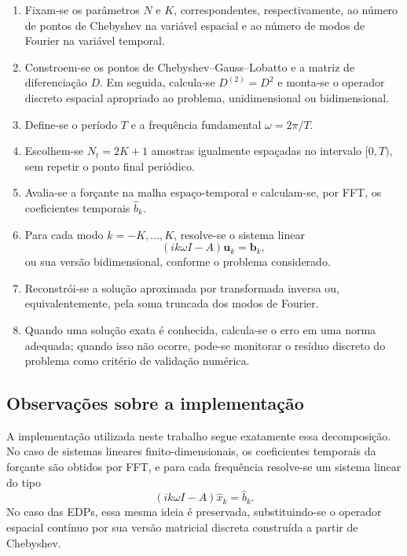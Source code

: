 \begin{enumerate}
    \item Fixam-se os parâmetros \(N\) e \(K\), correspondentes, respectivamente, ao número de pontos de Chebyshev na variável espacial e ao número de modos de Fourier na variável temporal.

    \item Constroem-se os pontos de Chebyshev--Gauss--Lobatto e a matriz de diferenciação \(D\). Em seguida, calcula-se \(D^{(2)}=D^2\) e monta-se o operador discreto espacial apropriado ao problema, unidimensional ou bidimensional.

    \item Define-se o período \(T\) e a frequência fundamental \(\omega=2\pi/T\).

    \item Escolhem-se \(N_t=2K+1\) amostras igualmente espaçadas no intervalo \([0,T)\), sem repetir o ponto final periódico.

    \item Avalia-se a forçante na malha espaço-temporal e calculam-se, por FFT, os coeficientes temporais \(\widehat{b}_k\).

    \item Para cada modo \(k=-K,\dots,K\), resolve-se o sistema linear
    \[
    \left(ik\omega I-A\right)\mathbf{u}_k=\mathbf{b}_k,
    \]
    ou sua versão bidimensional, conforme o problema considerado.

    \item Reconstrói-se a solução aproximada por transformada inversa ou, equivalentemente, pela soma truncada dos modos de Fourier.

    \item Quando uma solução exata é conhecida, calcula-se o erro em uma norma adequada; quando isso não ocorre, pode-se monitorar o resíduo discreto do problema como critério de validação numérica.
\end{enumerate}

\subsection{Observações sobre a implementação}

A implementação utilizada neste trabalho segue exatamente essa decomposição. No caso de sistemas lineares finito-dimensionais, os coeficientes temporais da forçante são obtidos por FFT, e para cada frequência resolve-se um sistema linear do tipo
\[
\left(i k\omega I-A\right)\widehat{x}_k=\widehat{b}_k.
\]
No caso das EDPs, essa mesma ideia é preservada, substituindo-se o operador espacial contínuo por sua versão matricial discreta construída a partir de Chebyshev.

